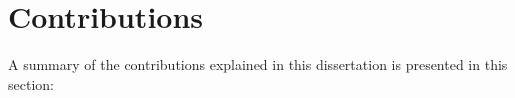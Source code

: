 \section{Contributions}
\label{sec:conclusions:contrib}

A summary of the contributions explained in this dissertation is presented in this section:

 \begin{comment}
\begin{itemize}
 \item An in-depth state of the art for activity monitoring, modelling and recognition was presented in Chapter \ref{cha:soa}.
 \begin{itemize}
  \item Providing a detailed taxonomy of activity recognition approaches.
  \item Analysing the advantages and disadvantages of activity modelling approaches.
 \end{itemize}


 \item A knowledge representation formalism for activities and intelligent environments was presented in Chapter \ref{cha:archi}.
 \begin{itemize}
  \item It offers a light-weight knowledge representation and processing framework based on JavaScript Object Notation (JSON) technology.
  \item It uses compact and easy-to-extend structures for activities, objects, locations and sensors, to achieve environment independence.
 \end{itemize}
 \end{comment}

